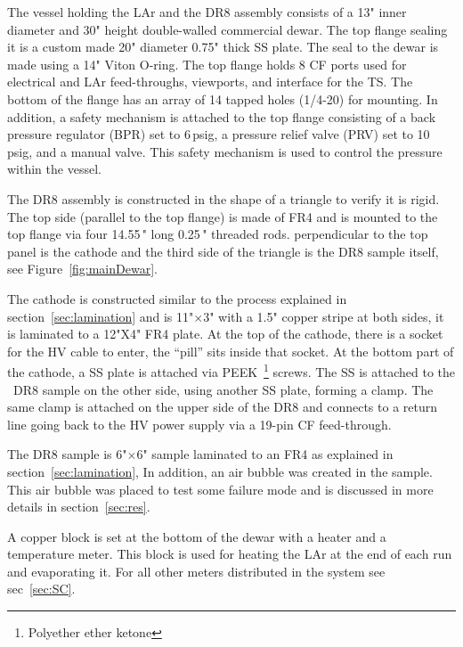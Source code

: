 \documentclass[a4paper,12pt]{article}
\newcommand{\DR}{DR8}
\begin{document}
The vessel holding the LAr and the {\DR} assembly consists of a 13" inner diameter and 30" height double-walled commercial dewar.  The top flange sealing it is a custom made 20" diameter 0.75" thick SS plate. The seal to the dewar is made using a 14" Viton O-ring. The top flange holds 8 CF ports used for electrical and LAr feed-throughs, viewports, and interface for the TS. The bottom of the flange has an array of 14 tapped holes (1/4-20) for mounting. In addition, a safety mechanism is attached to the top flange consisting of a back pressure regulator (BPR) set to 6\,psig, a pressure relief valve (PRV) set to 10\,psig, and a manual valve. This safety mechanism is used to control the pressure within the vessel.

The {\DR} assembly is constructed in the shape of a triangle to verify it is rigid. The top side (parallel to the top flange) is made of FR4 and is mounted to the top flange via four 14.55\," long 0.25\," threaded rods. perpendicular to the top panel is the cathode and the third side of the triangle is the {\DR} sample itself, see Figure~\ref{fig:mainDewar}. 

The cathode is constructed similar to the process explained in section~\ref{sec:lamination} and is 11"$\times$3" with a 1.5" copper stripe at both sides, it is laminated to a 12"X4" FR4 plate. At the top of the cathode, there is a socket for the HV cable to enter, the ``pill'' sits inside that socket. At the bottom part of the cathode, a SS plate is attached via PEEK~\footnote{Polyether ether ketone} screws. The SS is attached to the ~{\DR} sample on the other side, using another SS plate, forming a clamp. The same clamp is attached on the upper side of the {\DR} and connects to a return line going back to the HV power supply via a 19-pin CF feed-through.

The {\DR} sample is 6"$\times$6" sample laminated to an FR4 as explained in section~\ref{sec:lamination}, In addition, an air bubble was created in the sample. This air bubble was placed to test some failure mode and is discussed in more details in section~\ref{sec:res}.

A copper block is set at the bottom of the dewar with a heater and a temperature meter. This block is used for heating the LAr at the end of each run and evaporating it. For all other meters distributed in the system see sec~\ref{sec:SC}.
\end{document}
